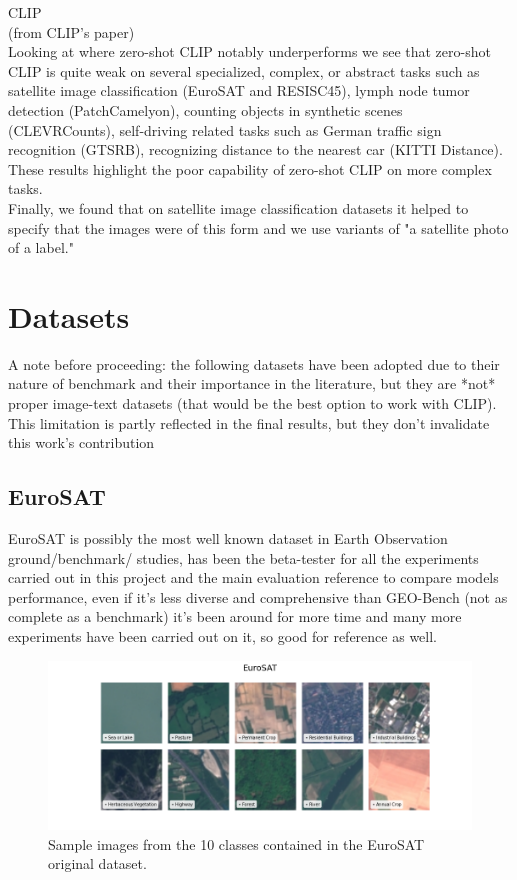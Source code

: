 \documentclass[a4paper, oneside, english]{sapthesis}
\begin{document}
CLIP \cite{radford2021learning} \\

(from CLIP's paper) \\

Looking at where zero-shot CLIP notably underperforms we see that zero-shot CLIP is quite weak on several specialized, complex, or abstract tasks such as satellite image classification (EuroSAT and RESISC45), lymph node tumor detection (PatchCamelyon), counting objects in synthetic
scenes (CLEVRCounts), self-driving related tasks such as German traffic sign recognition (GTSRB), recognizing distance to the nearest car (KITTI Distance). These results highlight the poor capability of zero-shot CLIP on more complex tasks. \\

Finally, we found that on satellite image classification datasets it helped to specify that the images were of
this form and we use variants of "a satellite photo
of a {label}."


\chapter{Datasets} %

A note before proceeding: the following datasets have been adopted due to their nature of benchmark and their importance in the literature, but they are *not* proper image-text datasets (that would be the best option to work with CLIP). This limitation is partly reflected in the final results, but they don't invalidate this work's contribution 

\section{EuroSAT}

EuroSAT \cite{helber2019eurosat} is possibly the most well known dataset in Earth Observation ground/benchmark/ studies, has been the beta-tester for all the experiments carried out in this project and the main evaluation reference to compare models performance, even if it's less diverse and comprehensive than GEO-Bench (not as complete as a benchmark) it's been around for more time and many more experiments have been carried out on it, so good for reference as well.

\begin{figure}[h]
    \centering
    \includegraphics[width=\textwidth]{img/EuroSAT_image_grid.png}
    \caption{Sample images from the 10 classes contained in the EuroSAT original dataset.}
    \label{fig:eurosatgrid}
\end{figure}
\end{document}
